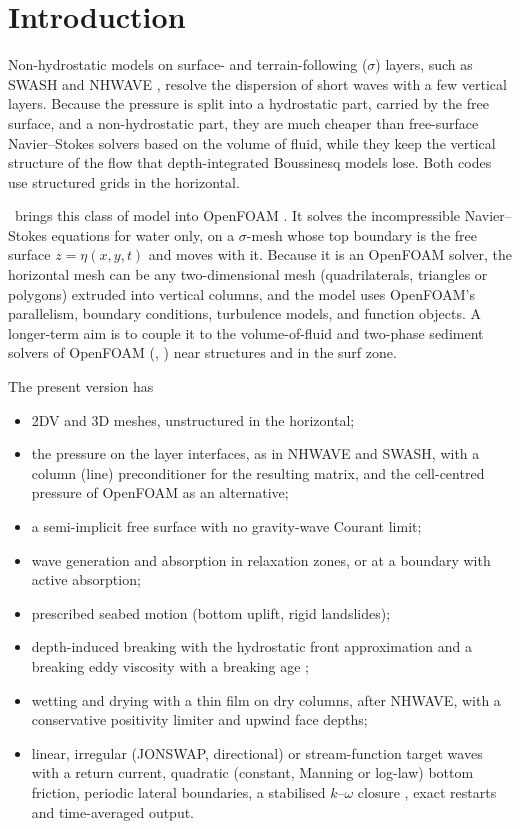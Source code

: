 \section{Introduction}
\label{sec:intro}

Non-hydrostatic models on surface- and terrain-following ($\sigma$) layers,
such as SWASH \citep{zijlema2011} and NHWAVE \citep{ma2012}, resolve the
dispersion of short waves with a few vertical layers. Because the pressure is
split into a hydrostatic part, carried by the free surface, and a
non-hydrostatic part, they are much cheaper than free-surface Navier--Stokes
solvers based on the volume of fluid, while they keep the vertical structure of
the flow that depth-integrated Boussinesq models lose. Both codes use
structured grids in the horizontal.

\NHFOAM\ brings this class of model into OpenFOAM \citep{weller1998}. It solves
the incompressible Navier--Stokes equations for water only, on a $\sigma$-mesh
whose top boundary is the free surface $z=\eta(x,y,t)$ and moves with it.
Because it is an OpenFOAM solver, the horizontal mesh can be any
two-dimensional mesh (quadrilaterals, triangles or polygons) extruded into
vertical columns, and the model uses OpenFOAM's parallelism, boundary
conditions, turbulence models,  and function objects. A
longer-term aim is to couple it to the volume-of-fluid and two-phase sediment
solvers of OpenFOAM (, ) near structures and
in the surf zone.

The present version has
\begin{itemize}[nosep]
  \item 2DV and 3D meshes, unstructured in the horizontal;
  \item the pressure on the layer interfaces, as in NHWAVE and SWASH, with a
        column (line) preconditioner for the resulting matrix, and the
        cell-centred pressure of OpenFOAM as an alternative;
  \item a semi-implicit free surface with no gravity-wave Courant limit;
  \item wave generation and absorption in relaxation zones, or at a
        boundary with active absorption;
  \item prescribed seabed motion (bottom uplift, rigid landslides);
  \item depth-induced breaking with the hydrostatic front approximation
        \citep{smit2013} and a breaking eddy viscosity with a breaking age
        \citep{kennedy2000};
  \item wetting and drying with a thin film on dry columns, after NHWAVE,
        with a conservative positivity limiter and upwind face depths;
  \item linear, irregular (JONSWAP, directional) or stream-function
        \citep{fenton1988} target waves with a return current,
        quadratic (constant, Manning or log-law) bottom friction, periodic
        lateral boundaries, a stabilised $k$--$\omega$ closure
        \citep{larsen2018}, exact restarts and time-averaged output.
\end{itemize}

